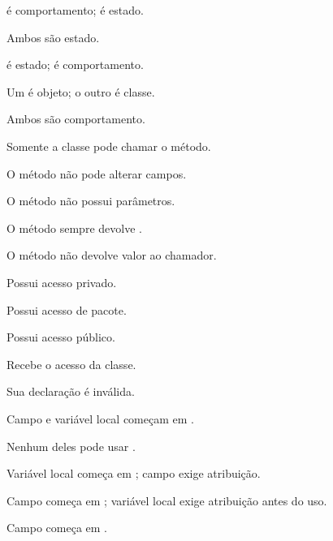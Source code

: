 \documentclass[11pt,a4paper]{article}
\begin{document}
\noindent\begin{minipage}[t]{.485\textwidth}
\begin{alternativas}
\item {} é comportamento;  é estado.
\item Ambos são estado.
\item {} é estado;  é comportamento.
\item Um é objeto; o outro é classe.
\item Ambos são comportamento.
\end{alternativas}
\begin{alternativas}
\item Somente a classe pode chamar o método.
\item O método não pode alterar campos.
\item O método não possui parâmetros.
\item O método sempre devolve .
\item O método não devolve valor ao chamador.
\end{alternativas}
\begin{alternativas}
\item Possui acesso privado. \item Possui acesso de pacote. \item Possui acesso público.
\item Recebe o acesso da classe. \item Sua declaração é inválida.
\end{alternativas}
\begin{alternativas}
\item Campo e variável local começam em .
\item Nenhum deles pode usar .
\item Variável local começa em ; campo exige atribuição.
\item Campo começa em ; variável local exige atribuição antes do uso.
\item Campo  começa em .
\end{alternativas}
\end{minipage}\hfill
\end{document}
